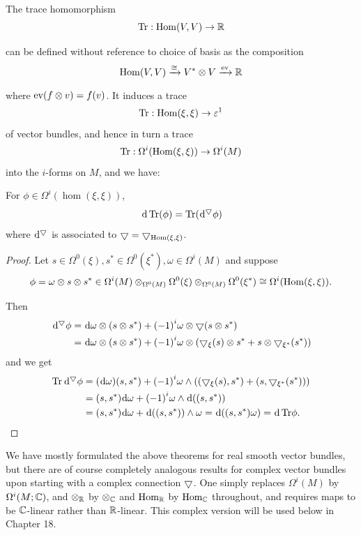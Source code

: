 The trace homomorphism
\[
  \mathrm{Tr}:\operatorname{Hom}(V, V)  \rightarrow  {\ensuremath{\mathbb{R}}}
\]

can be defined without reference to choice of basis as the composition
\[
  \hom(V, V)\xra[\simee] V^*\otimes V \xra*[ev] \RR
\]
where $\mathrm{ev}( {f \otimes  v})  = f( v)$. It induces a trace
\[
  \mathrm{Tr}:\operatorname{Hom}(\xi, \xi)  \rightarrow  {\varepsilon }^1
\]
of vector bundles, and hence in turn a trace
\[
  \mathrm{Tr}:\Omega^{i}( \operatorname{Hom}(\xi, \xi)) \rightarrow \Omega^{i}(M)
\]
into the $i$-forms on $M$, and we have:

\begin{theorem}\label{theorem:17-14}
  For $\phi  \in  \Omega^{i}( \hom(\xi, \xi))$,
  \[
    \dd\,\R{Tr}( \phi ) = \R{Tr}(\!\dd^\btd\phi)
  \]
  where $\dd^\btd$ is associated to $\bigtriangledown  = \bigtriangledown_{\operatorname{Hom}(\xi, \xi)}$.
\end{theorem}

\begin{proof}
Let $s \in  \Omega^0(\xi),s^* \in  \Omega^0( \xi^*),\omega  \in  \Omega^{i}(M)$ and suppose
\[
  \phi  
  = \omega  \otimes  s \otimes  s^* 
  \in  \Omega^{i}(M) \otimes_{\Omega^0(M) }\Omega^0(\xi) \otimes_{\Omega^0(M) }\Omega^0( \xi^*)  
  \cong  \Omega^{i}( \operatorname{Hom}(\xi, \xi)).
\]

Then
\begin{align*}
    \dd^\btd\phi  
  & = {\!\dd\omega } \otimes  ( {s \otimes  s^*})  + {(-1) }^{i}\omega  \otimes  \btd ( {s \otimes  s^*}) \\
  & = {\!\dd\omega } \otimes  ( {s \otimes  s^*})  + {(-1) }^{i}\omega  \otimes  ( {\btd_{\xi }(s)  \otimes  s^* + s \otimes  \btd_{\xi^*}( s^*) })
\end{align*}
and we get
\begin{align*}
    \R{Tr}\dd^\btd\phi  
  & = ( {\!\dd\omega }) ( {s,s^*})  + {(-1) }^{i}\omega  \land  ( {( {\btd_{\xi }(s),s^*})  + ( {s,\btd_{\xi^*}( s^*) }) }) \\
  & = ( {s,s^*}) {\!\dd\omega } + {(-1) }^{i}\omega  \land  \!\dd( ( {s,s^*}) ) \\
  & = ( {s,s^*}) {\!\dd\omega } + \!\dd( ( {s,s^*}) )  \land  \omega  = \!\dd( {( {s,s^*}) \omega })  = \!\dd\,\R{Tr}\phi.
\end{align*}
\end{proof}

We have mostly formulated the above theorems for real smooth vector bundles, but there are of course completely 
analogous results for complex vector bundles upon starting with a complex connection $\bigtriangledown$. One simply 
replaces $\Omega^{i}(M)$ by $\Omega^{i}( {M;{\mathbb{C}}})$, and $\otimes_{{\mathbb{R}}}$ by $\otimes_{{\mathbb{C}}}$ 
and $\operatorname{Hom}_{\mathbb{R}}$ by $\operatorname{Hom}_{\mathbb{C}}$ throughout, and requires maps to 
be ${\mathbb{C}}$-linear rather than ${\mathbb{R}}$-linear. This complex version will be used below in Chapter 18.

